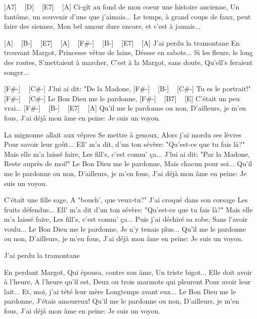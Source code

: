 [A7] ~ [D] ~ [E7] ~ [A]
Ci-gît au fond de mon coeur une histoire ancienne,
Un fantôme, un souvenir d'une que j'aimais...
Le temps, à grand coups de faux, peut faire des siennes,
Mon bel amour dure encore, et c'est à jamais...

[A] ~ [B-] ~ [E7] ~ [A] ~ [F#-] ~ [B-] ~ [E7] ~ [A]
J'ai perdu la tramontane
En trouvant Margot,
Princesse vêtue de laine,
Déesse en sabots...
Si les fleurs, le long des routes,
S'mettaient à marcher,
C'est à la Margot, sans doute,
Qu'ell's feraient songer...

[F#-] ~ [C#-]
J'lui ai dit: "De la Madone,
 [F#-] ~ [B-] ~ [C#-]
Tu es le portrait!"
[F#-] ~ [C#-]
Le Bon Dieu me le pardonne,
[F#-] ~ [B7] ~ [E]
C'était un peu vrai...
[F#-] ~ [B-] ~ [E7] ~ [A]
Qu'il me le pardonne ou non,
D'ailleurs, je m'en fous,
J'ai déjà mon âme en peine:
Je suis un voyou.


La mignonne allait aux vêpres
Se mettre à genoux,
Alors j'ai mordu ses lèvres
Pour savoir leur goût...
Ell' m'a dit, d'un ton sévère:
"Qu'est-ce que tu fais là?"
Mais elle m'a laissé faire,
Les fill's, c'est comm' ça...
J'lui ai dit: "Par la Madone,
Reste auprès de moi!"
Le Bon Dieu me le pardonne,
Mais chacun pour soi...
Qu'il me le pardonne ou non,
D'ailleurs, je m'en fous,
J'ai déjà mon âme en peine:
Je suis un voyou.


C'était une fille sage,
A "bouch', que veux-tu?"
J'ai croqué dans son corsage
Les fruits défendus...
Ell' m'a dit d'un ton sévère:
"Qu'est-ce que tu fais là?"
Mais elle m'a laissé faire,
Les fill's, c'est comm' ça...
Puis j'ai déchiré sa robe,
Sans l'avoir voulu...
Le Bon Dieu me le pardonne,
Je n'y tenais plus...
Qu'il me le pardonne ou non,
D'ailleurs, je m'en fous,
J'ai déjà mon âme en peine:
Je suis un voyou.

J'ai perdu la tramontane

En perdant Margot,
Qui épousa, contre son âme,
Un triste bigot...
Elle doit avoir à l'heure,
A l'heure qu'il est,
Deux ou trois marmots qui pleurent
Pour avoir leur lait...
Et, moi, j'ai tété leur mère
Longtemps avant eux...
Le Bon Dieu me le pardonne,
J'étais amoureux!
Qu'il me le pardonne ou non,
D'ailleurs, je m'en fous,
J'ai déjà mon âme en peine:
Je suis un voyou.


